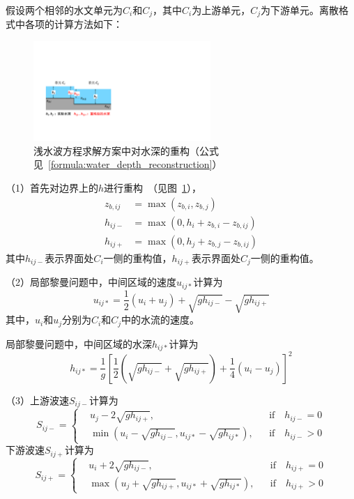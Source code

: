 假设两个相邻的水文单元为$C_i$和$C_j$，其中$C_i$为上游单元，$C_j$为下游单元。离散格式中各项的计算方法如下：

{
\begin{figure}[htbp]
\centering
\includegraphics[width=0.6\textwidth]{Figures/侧向流/水深重构.pdf}
\caption{浅水波方程求解方案中对水深的重构（公式见~\ref{formula:water_depth_reconstruction}）}
\label{fig:水深重构}
\end{figure}
}

（1）首先对边界上的$h$进行重构~\citep{audusse2004scientificcomputing}（见图~\ref{fig:水深重构}），
\begin{equation} \label{formula:water_depth_reconstruction}
\begin{aligned}
z_{b,ij} & = \max\left(z_{b,i}, z_{b,j}\right) \\
h_{ij-} & =  \max\left(0, h_i + z_{b,i} - z_{b,ij} \right) \\
h_{ij+} & =  \max\left(0, h_j + z_{b,j} - z_{b,ij} \right)
\end{aligned}
\end{equation}
其中$h_{ij-}$表示界面处$C_i$一侧的重构值，$h_{ij+}$表示界面处$C_j$一侧的重构值。

（2）局部黎曼问题中，中间区域的速度$u_{ij*}$计算为
	\begin{equation}
		u_{ij*} = \frac{1}{2}\left(u_i + u_j\right) + \sqrt{g h_{ij-}} - \sqrt{g h_{ij+}}
	\end{equation}
其中，$u_i$和$u_j$分别为$C_i$和$C_j$中的水流的速度。 

局部黎曼问题中，中间区域的水深$h_{ij*}$计算为
	\begin{equation}
		h_{ij*} = \frac{1}{g}\left[\frac{1}{2}\left(\sqrt{g h_{ij-}} + \sqrt{g h_{ij+}}\right) + \frac{1}{4}\left(u_i - u_j\right)\right]^2
	\end{equation}

（3）上游波速$S_{ij-}$计算为
	\begin{equation}
		S_{ij-} = \left\{
		\begin{aligned}
			&u_j - 2\sqrt{gh_{ij+}}, && \mbox{if} \quad h_{ij-} = 0 \\
			& \min \left(u_i - \sqrt{gh_{ij-}}, u_{ij*} - \sqrt{gh_{ij*}}\right), && \mbox{if} \quad h_{ij-} > 0
		\end{aligned}\right.
	\end{equation}
下游波速$S_{ij+}$计算为
	\begin{equation}
		S_{ij+} = \left\{
		\begin{aligned}
			&u_i + 2\sqrt{gh_{ij-}}, && \mbox{if} \quad h_{ij+} = 0 \\
			& \max \left(u_j + \sqrt{gh_{ij+}}, u_{ij*} + \sqrt{gh_{ij*}}\right), && \mbox{if} \quad h_{ij+} > 0
		\end{aligned}\right.
	\end{equation}

